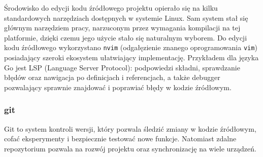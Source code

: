 Środowisko do edycji kodu źródłowego projektu opierało się na kilku standardowych narzędziach dostępnych w systemie Linux. Sam system stał się głównym narzędziem pracy, narzuconym przez wymagania kompilacji na tej platformie, dzięki czemu jego użycie stało się naturalnym wyborem. Do edycji kodu źródłowego wykorzystano \verb|nvim| (odgałęzienie znanego oprogramowania \verb|vim|) posiadający szeroki ekosystem ułatwiający implementację. Przykładem dla języka Go jest LSP (Language Server Protocol): podpowiedzi składni, sprawdzanie błędów oraz nawigacja po definicjach i referencjach, a także debugger pozwalający sprawnie znajdować i poprawiać błędy w kodzie źródłowym.

\subsubsection{git}

Git to system kontroli wersji, który pozwala śledzić zmiany w kodzie źródłowym, cofać eksperymenty i bezpiecznie testować nowe funkcje. Natomiast zdalne repozytorium pozwala na rozwój projektu oraz synchronizację na wiele urządzeń.

